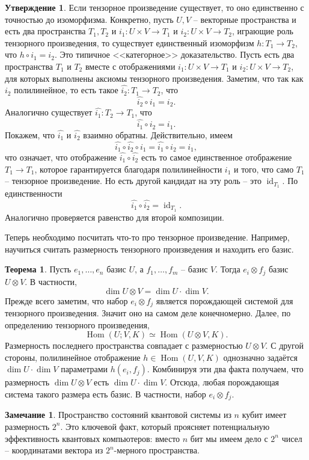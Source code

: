 \documentclass[10pt,a4paper,oneside]{book}
\theoremstyle{definition}
\newtheorem*{rem}{\color{green!50!blue}Замечание}
\newtheorem{thm}{\color{red!40!black}Теорема}
\newtheorem{utvr}{\color{blue!50!black}Утверждение}
\newcommand{\id}{\operatorname{id}}
\newcommand{\Hom}{\operatorname{Hom}}
\def\thrm{\begin{thm}}
\def\ethrm{\end{thm}}
\def\rm{\begin{rem}}
\def\erm{\end{rem}}
\def\utv{\begin{utvr}}
\def\eutv{\end{utvr}}
\begin{document}
\utv Если тензорное произведение существует, то оно единственно с точностью до изоморфизма. Конкретно, пусть $U,V$ -- векторные пространства и есть два пространства $T_1,T_2$ и $i_1 \colon U\times V \to T_1$ и $i_2\colon U\times V \to T_2$, играющие роль тензорного произведения, то существует единственный изоморфизм $h\colon T_1\to T_2$, что $h\circ i_1=i_2$.
\proof Это типичное <<категорное>> доказательство. Пусть есть два пространства $T_1$ и $T_2$ вместе с отображениями $i_1 \colon U\times V \to T_1$ и $i_2 \colon  U\times V \to T_2$, для которых выполнены аксиомы тензорного произведения. Заметим, что так как $i_2$ полилинейное, то есть такое $\hat{i_2} \colon T_1 \to T_2$, что $$\hat{i_2}\circ i_1= i_2.$$ 
Аналогично существует $\hat{i_1} \colon T_2 \to T_1$, что
$$\hat{i_1}\circ i_2= i_1.$$ 
Покажем, что $\hat{i_1} $ и $\hat{i_2}$ взаимно обратны. Действительно, имеем
$$\hat{i_1}\circ \hat{i_2}\circ i_1= \hat{i_1}\circ i_2= i_1,$$
что означает, что отображение $\hat{i_1}\circ \hat{i_2}$ есть то самое единственное отображение $T_1\to T_1$, которое гарантируется благодаря полилинейности $i_1$ и того, что само $T_1$ -- тензорное произведение. Но есть другой кандидат на эту роль -- это $\id_{T_1}$. По единственности 
$$\hat{i_1}\circ \hat{i_2}=\id_{T_1}.$$
Аналогично проверяется равенство для второй композиции.
\endproof
\eutv





Теперь необходимо посчитать что-то про тензорное произведение. Например, научиться считать размерность тензорного произведения и находить его базис.
\thrm Пусть $e_1,\dots,e_n$ базис $U$, а $f_1,\dots,f_m$ -- базис $V$. Тогда $e_i\otimes f_j$ базис $U \otimes V$. В частности, 
$$\dim U \otimes V= \dim U \cdot \dim V.$$ 
\proof Прежде всего заметим, что набор $e_i \otimes f_j$ является порождающей системой для тензорного произведения. Значит оно на самом деле конечномерно. Далее, по определению тензорного произведения,
$$\Hom(U;V, K) \simeq \Hom(U\otimes  V,K).$$
Размерность последнего пространства совпадает с размерностью $U\otimes V$. С другой стороны, полилинейное отображение $h \in \Hom(U,V, K)$ однозначно задаётся $\dim U \cdot \dim V$  параметрами $h(e_i,f_j)$. Комбинируя эти два факта получаем, что размерность $\dim U \otimes V$ есть $\dim U \cdot \dim V$. Отсюда, любая порождающая система такого размера есть базис. В частности, набор $e_i \otimes f_j$.
\endproof
\ethrm


\rm Пространство состояний квантовой системы из $n$ кубит имеет размерность $2^n$. Это ключевой факт, который проясняет потенциальную эффективность квантовых компьютеров: вместо $n$ бит мы имеем дело с $2^n$ чисел -- координатами вектора из $2^n$-мерного пространства.
\erm
\end{document}
